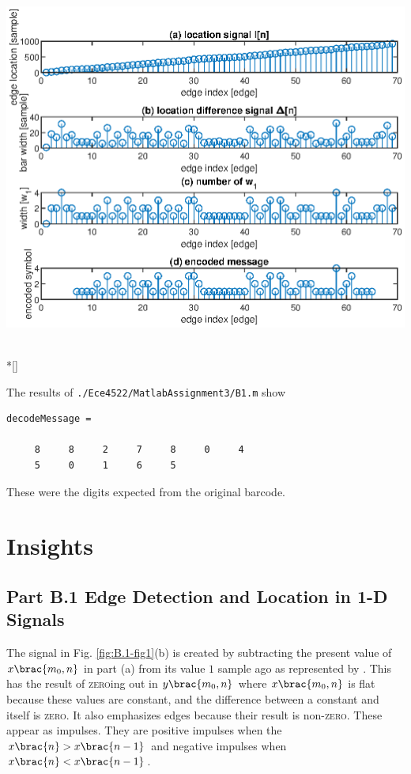 \documentclass[conference]{../lib/IEEEtran}
\renewenvironment*{figure}[1][]
    {
        \minipage{\linewidth}
    }
    {
        \endminipage
        \\*[\intextsep]
    }
\DeclarePairedDelimiter\brac[]%
\newcommand*\tbrao[1]{(#1)}
\begin{document}
\begin{figure}
    \centering
    \includegraphics[width=\linewidth]{ece4522ma3fig3.eps}
    \label{fig:B.2-fig3}
\end{figure}

The results of \texttt{./Ece4522/MatlabAssignment3/B1.m} show
\begin{verbatim}
decodeMessage =

     8     8     2     7     8     0     4
     5     0     1     6     5
\end{verbatim}

These were the digits expected from the original barcode.

\section{Insights}

\subsection{Part B.1 Edge Detection and Location in 1-D Signals}

The signal in Fig. \ref{fig:B.1-fig1}(b) is created by subtracting the present value of \(x\brac{m_0, n}\) in part (a) from its value \(1\) sample ago as represented by \tbrao{\ref{eqn:bdn}}. This has the result of \textsc{zero}ing out in \(y\brac{m_0, n}\) where \(x\brac{m_0, n}\) is flat because these values are constant, and the difference between a constant and itself is \textsc{zero}. It also emphasizes edges because their result is non-\textsc{zero}. These appear as impulses. They are positive impulses when the \(x\brac{n} > x\brac{n - 1}\) and negative impulses when \(x\brac{n} < x\brac{n - 1}\).
\end{document}
